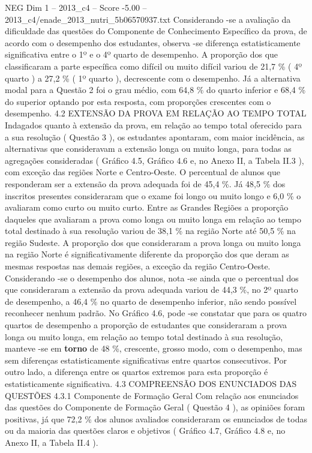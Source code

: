 \begin{textsample}{NEG Dim 1 – 2013\_c4 – Score -5.00 – 2013\_c4/enade\_2013\_nutri\_5b06570937.txt}
Considerando -se a avaliação da dificuldade das questões do Componente de Conhecimento Específico da prova, de acordo com o desempenho dos estudantes, observa -se diferença estatisticamente significativa entre o 1º e o 4º quarto de desempenho.
A proporção dos que classificaram a parte específica como difícil ou muito difícil variou de 21,7 \% ( 4º quarto ) a 27,2 \% ( 1º quarto ), decrescente com o desempenho.
Já a alternativa modal para a Questão 2 foi o grau médio, com 64,8 \% do quarto inferior e 68,4 \% do superior optando por esta resposta, com proporções crescentes com o desempenho. 4.2 EXTENSÃO DA PROVA EM RELAÇÃO AO TEMPO TOTAL Indagados quanto à extensão da prova, em relação ao tempo total oferecido para a sua resolução ( Questão 3 ), os estudantes apontaram, com maior incidência, as alternativas que consideravam a extensão longa ou muito longa, para todas as agregações consideradas ( Gráfico 4.5, Gráfico 4.6 e, no Anexo II, a Tabela II.3 ), com exceção das regiões Norte e Centro-Oeste.
O percentual de alunos que responderam ser a extensão da prova adequada foi de 45,4 \%.
Já 48,5 \% dos inscritos presentes consideraram que o exame foi longo ou muito longo e 6,0 \% o avaliaram como curto ou muito curto.
Entre as Grandes Regiões a proporção daqueles que avaliaram a prova como longa ou muito longa em relação ao tempo total destinado à sua resolução variou de 38,1 \% na região Norte até 50,5 \% na região Sudeste.
A proporção dos que consideraram a prova longa ou muito longa na região Norte é significativamente diferente da proporção dos que deram as mesmas respostas nas demais regiões, a exceção da região Centro-Oeste.
Considerando -se o desempenho dos alunos, nota -se ainda que o percentual dos que consideraram a extensão da prova adequada variou de 44,3 \%, no 2º quarto de desempenho, a 46,4 \% no quarto de desempenho inferior, não sendo possível reconhecer nenhum padrão.
No Gráfico 4.6, pode -se constatar que para os quatro quartos de desempenho a proporção de estudantes que consideraram a prova longa ou muito longa, em relação ao tempo total destinado à sua resolução, manteve -se em \textbf{torno} de 48 \%, crescente, grosso modo, com o desempenho, mas sem diferenças estatisticamente significativas entre quartos consecutivos.
Por outro lado, a diferença entre os quartos extremos para esta proporção é estatisticamente significativa. 4.3 COMPREENSÃO DOS ENUNCIADOS DAS QUESTÕES 4.3.1 Componente de Formação Geral Com relação aos enunciados das questões do Componente de Formação Geral ( Questão 4 ), as opiniões foram positivas, já que 72,2 \% dos alunos avaliados consideraram os enunciados de todas ou da maioria das questões claros e objetivos ( Gráfico 4.7, Gráfico 4.8 e, no Anexo II, a Tabela II.4 ).

\end{textsample}
